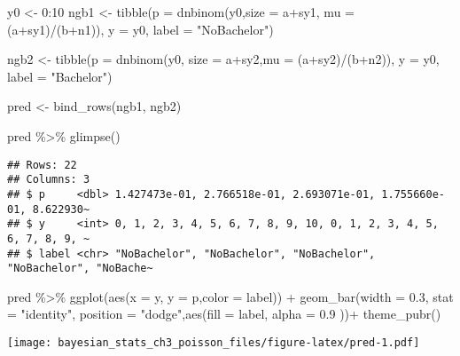 \documentclass[
]{article}
\newenvironment{Shaded}{\begin{snugshade}}{\end{snugshade}}
\newcommand{\AttributeTok}[1]{\textcolor[rgb]{0.77,0.63,0.00}{#1}}
\newcommand{\DecValTok}[1]{\textcolor[rgb]{0.00,0.00,0.81}{#1}}
\newcommand{\FloatTok}[1]{\textcolor[rgb]{0.00,0.00,0.81}{#1}}
\newcommand{\FunctionTok}[1]{\textcolor[rgb]{0.00,0.00,0.00}{#1}}
\newcommand{\NormalTok}[1]{#1}
\newcommand{\OtherTok}[1]{\textcolor[rgb]{0.56,0.35,0.01}{#1}}
\newcommand{\SpecialCharTok}[1]{\textcolor[rgb]{0.00,0.00,0.00}{#1}}
\newcommand{\StringTok}[1]{\textcolor[rgb]{0.31,0.60,0.02}{#1}}
\begin{document}
\begin{Shaded}
\begin{Highlighting}[]
\NormalTok{y0 }\OtherTok{\textless{}{-}} \DecValTok{0}\SpecialCharTok{:}\DecValTok{10}
\NormalTok{ngb1 }\OtherTok{\textless{}{-}} \FunctionTok{tibble}\NormalTok{(}\AttributeTok{p =} \FunctionTok{dnbinom}\NormalTok{(y0,}\AttributeTok{size =}\NormalTok{ a}\SpecialCharTok{+}\NormalTok{sy1, }\AttributeTok{mu =}\NormalTok{ (a}\SpecialCharTok{+}\NormalTok{sy1)}\SpecialCharTok{/}\NormalTok{(b}\SpecialCharTok{+}\NormalTok{n1)),}
               \AttributeTok{y =}\NormalTok{ y0,}
              \AttributeTok{label =} \StringTok{"NoBachelor"}\NormalTok{)}

\NormalTok{ngb2 }\OtherTok{\textless{}{-}} \FunctionTok{tibble}\NormalTok{(}\AttributeTok{p =} \FunctionTok{dnbinom}\NormalTok{(y0, }\AttributeTok{size =}\NormalTok{ a}\SpecialCharTok{+}\NormalTok{sy2,}\AttributeTok{mu =}\NormalTok{ (a}\SpecialCharTok{+}\NormalTok{sy2)}\SpecialCharTok{/}\NormalTok{(b}\SpecialCharTok{+}\NormalTok{n2)),}
               \AttributeTok{y =}\NormalTok{ y0,}
               \AttributeTok{label =} \StringTok{"Bachelor"}\NormalTok{)}

\NormalTok{pred }\OtherTok{\textless{}{-}} \FunctionTok{bind\_rows}\NormalTok{(ngb1, ngb2)}

\NormalTok{pred }\SpecialCharTok{\%\textgreater{}\%} \FunctionTok{glimpse}\NormalTok{()}
\end{Highlighting}
\end{Shaded}

\begin{verbatim}
## Rows: 22
## Columns: 3
## $ p     <dbl> 1.427473e-01, 2.766518e-01, 2.693071e-01, 1.755660e-01, 8.622930~
## $ y     <int> 0, 1, 2, 3, 4, 5, 6, 7, 8, 9, 10, 0, 1, 2, 3, 4, 5, 6, 7, 8, 9, ~
## $ label <chr> "NoBachelor", "NoBachelor", "NoBachelor", "NoBachelor", "NoBache~
\end{verbatim}

\begin{Shaded}
\begin{Highlighting}[]
\NormalTok{pred }\SpecialCharTok{\%\textgreater{}\%} 
  \FunctionTok{ggplot}\NormalTok{(}\FunctionTok{aes}\NormalTok{(}\AttributeTok{x =}\NormalTok{ y, }\AttributeTok{y =}\NormalTok{ p,}\AttributeTok{color =}\NormalTok{ label)) }\SpecialCharTok{+} 
  \FunctionTok{geom\_bar}\NormalTok{(}\AttributeTok{width =} \FloatTok{0.3}\NormalTok{, }\AttributeTok{stat =} \StringTok{"identity"}\NormalTok{, }\AttributeTok{position =} \StringTok{"dodge"}\NormalTok{,}\FunctionTok{aes}\NormalTok{(}\AttributeTok{fill =}\NormalTok{ label, }\AttributeTok{alpha =} \FloatTok{0.9}\NormalTok{ ))}\SpecialCharTok{+}
  \FunctionTok{theme\_pubr}\NormalTok{()}
\end{Highlighting}
\end{Shaded}

\texttt{[image: bayesian\_stats\_ch3\_poisson\_files/figure-latex/pred-1.pdf]}
\end{document}
